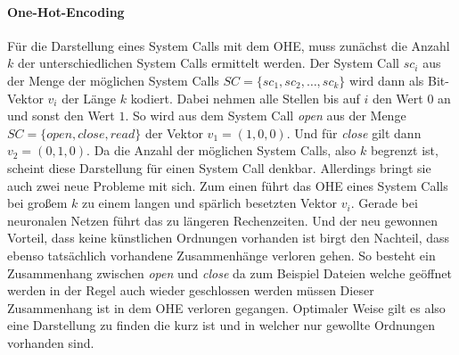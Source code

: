             \paragraph{One-Hot-Encoding}
                Für die Darstellung eines System Calls mit dem \ac{OHE}, muss zunächst die Anzahl $k$ der unterschiedlichen System Calls ermittelt werden.
                Der System Call $sc_i$ aus der Menge der möglichen System Calls $ SC = \{sc_1,sc_2,\dots,sc_k\}$ wird dann als Bit-Vektor $v_i$ der Länge $k$ kodiert.
                Dabei nehmen alle Stellen bis auf $i$ den Wert $0$ an und sonst den Wert $1$.
                So wird aus dem System Call \textit{open} aus der Menge $SC = \{open, close, read\}$ der Vektor $v_1 = (1, 0, 0)$.
                Und für \textit{close} gilt dann $v_2 = (0,1,0)$.
                Da die Anzahl der möglichen System Calls, also $k$ begrenzt ist, scheint diese Darstellung für einen System Call denkbar.
                Allerdings bringt sie auch zwei neue Probleme mit sich.
                Zum einen führt das \ac{OHE} eines System Calls bei großem $k$ zu einem langen und spärlich besetzten Vektor $v_i$.
                Gerade bei neuronalen Netzen führt das zu längeren Rechenzeiten.
                Und der neu gewonnen Vorteil, dass keine künstlichen Ordnungen vorhanden ist birgt den Nachteil, dass ebenso tatsächlich vorhandene Zusammenhänge verloren gehen.
                So besteht ein Zusammenhang zwischen \textit{open} und \textit{close} da zum Beispiel Dateien welche geöffnet werden in der Regel auch wieder geschlossen werden müssen
                Dieser Zusammenhang ist in dem \ac{OHE} verloren gegangen. 
                Optimaler Weise gilt es also eine Darstellung zu finden die kurz ist und in welcher nur gewollte Ordnungen vorhanden sind.
